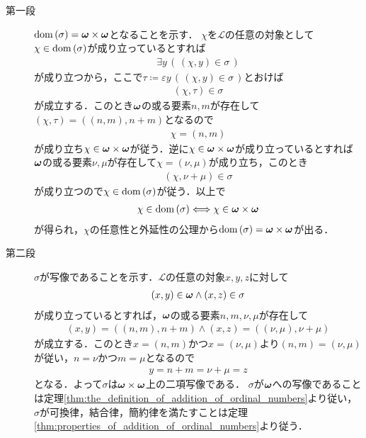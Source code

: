 	\begin{prf}\mbox{}
		\begin{description}
			\item[第一段]
				$\operatorname*{dom} \left(\sigma\right) = {\boldsymbol \omega} \times {\boldsymbol \omega}$となることを示す．
				$\chi$を$\mathcal{L}$の任意の対象として$\chi \in \operatorname*{dom} \left(\sigma\right)$が成り立っているとすれば
				\begin{align}
					\exists y\, (\, (\chi,y) \in \sigma\, )
				\end{align}
				が成り立つから，ここで$\tau \coloneqq \varepsilon y\, (\, (\chi,y) \in \sigma\, )$とおけば
				\begin{align}
					(\chi,\tau) \in \sigma
				\end{align}
				が成立する．このとき${\boldsymbol \omega}$の或る要素$n,m$が存在して$(\chi,\tau) = ((n,m),n+m)$となるので
				\begin{align}
					\chi = (n,m)
				\end{align}
				が成り立ち$\chi \in {\boldsymbol \omega} \times {\boldsymbol \omega}$が従う．逆に$\chi \in {\boldsymbol \omega} \times {\boldsymbol \omega}$が成り立っているとすれば
				${\boldsymbol \omega}$の或る要素$\nu,\mu$が存在して$\chi = (\nu,\mu)$が成り立ち，このとき
				\begin{align}
					(\chi,\nu + \mu) \in \sigma
				\end{align}
				が成り立つので$\chi \in \operatorname*{dom} \left(\sigma\right)$が従う．以上で
				\begin{align}
					\chi \in \operatorname*{dom} \left(\sigma\right) \Longleftrightarrow \chi \in {\boldsymbol \omega} \times {\boldsymbol \omega}
				\end{align}
				が得られ，$\chi$の任意性と外延性の公理から$\operatorname*{dom} \left(\sigma\right) = {\boldsymbol \omega} \times {\boldsymbol \omega}$が出る．
				
			\item[第二段]
				$\sigma$が写像であることを示す．$\mathcal{L}$の任意の対象$x,y,z$に対して
				\begin{align}
					(x,y) \in {\boldsymbol \omega} \wedge (x,z) \in \sigma
				\end{align}
				が成り立っているとすれば，${\boldsymbol \omega}$の或る要素$n,m,\nu,\mu$が存在して
				\begin{align}
					(x,y) = ((n,m),n+m) \wedge (x,z) = ((\nu,\mu),\nu+\mu)
				\end{align}
				が成立する．このとき$x=(n,m)$かつ$x=(\nu,\mu)$より$(n,m) = (\nu,\mu)$が従い，$n=\nu$かつ$m=\mu$となるので
				\begin{align}
					y = n+m = \nu+\mu = z
				\end{align}
				となる．よって$\sigma$は${\boldsymbol \omega} \times {\boldsymbol \omega}$上の二項写像である．
				$\sigma$が${\boldsymbol \omega}$への写像であることは定理\ref{thm:the_definition_of_addition_of_ordinal_numbers}より従い，
				$\sigma$が可換律，結合律，簡約律を満たすことは定理\ref{thm:properties_of_addition_of_ordinal_numbers}より従う．
				\QED
		\end{description}
	\end{prf}
	
